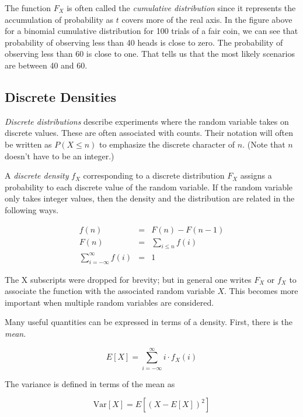 \documentclass[]{article}
\begin{document}
The function $F_X$ is often called the
\emph{cumulative distribution} since it represents the
accumulation of probability as $t$ covers more of the
real axis.  In the figure above for a binomial
cumulative distribution for 100 trials of a fair coin,
we can see that probability of observing less than 40
heads is close to zero.  The probability of observing
less than 60 is close to one.  That tells us that the
most likely scenarios are between 40 and 60.

\subsection{Discrete Densities}

\emph{Discrete distributions} describe experiments where the
random variable takes on discrete values.  These are
often associated with counts.  Their notation will often
be written as $P(X \le n)$ to emphasize the discrete character
of $n$. (Note that $n$ doesn't have to be an integer.)

A \emph{discrete density} $f_X$ corresponding to a discrete
distribution $F_X$ assigns a probability to each discrete value
of the random variable.  If the random variable only takes
integer values, then the density and the distribution
are related in the following ways.

\begin{eqnarray*}
f(n) & = & F(n) - F(n-1)\\
F(n) & = & \sum_{i \le n} f(i)\\
\sum_{i=-\infty}^{\infty} f(i) & = & 1
\end{eqnarray*}

The X subscripts were dropped for brevity; but in general
one writes $F_X$ or $f_X$ to associate the function with
the associated random variable $X$.  This becomes more
important when multiple random variables are considered.

Many useful quantities can be expressed in terms of a density.
First, there is the \emph{mean}.

\begin{equation} \label{discrete_mean}
E[X] = \sum_{i = -\infty}^{\infty} i \cdot f_X(i)
\end{equation}

The variance is defined in terms of the mean as

\begin{equation} \label{def_variance}
\mbox{Var}[X] = E\left[(X - E[X])^2 \right]
\end{equation}
\end{document}
